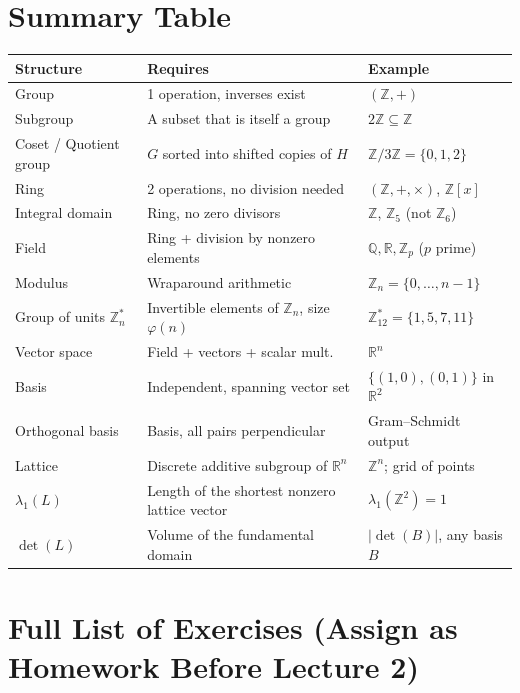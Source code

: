 \section{Summary Table}
\label{sec:L1:summary-table}

\begin{center}
\renewcommand{\arraystretch}{1.3}
\begin{tabular}{|l|l|l|}
\hline
\textbf{Structure} & \textbf{Requires} & \textbf{Example} \\
\hline
Group & 1 operation, inverses exist & $(\mathbb{Z}, +)$ \\
Subgroup & A subset that is itself a group & $2\mathbb{Z} \subseteq \mathbb{Z}$ \\
Coset / Quotient group & $G$ sorted into shifted copies of $H$ & $\mathbb{Z}/3\mathbb{Z} = \{0,1,2\}$ \\
Ring & 2 operations, no division needed & $(\mathbb{Z}, +, \times)$, $\mathbb{Z}[x]$ \\
Integral domain & Ring, no zero divisors & $\mathbb{Z}$, $\mathbb{Z}_5$ (not $\mathbb{Z}_6$) \\
Field & Ring + division by nonzero elements & $\mathbb{Q}, \mathbb{R}, \mathbb{Z}_p$ ($p$ prime) \\
Modulus & Wraparound arithmetic & $\mathbb{Z}_n = \{0,\ldots,n-1\}$ \\
Group of units $\mathbb{Z}_n^*$ & Invertible elements of $\mathbb{Z}_n$, size $\varphi(n)$ & $\mathbb{Z}_{12}^* = \{1,5,7,11\}$ \\
Vector space & Field + vectors + scalar mult. & $\mathbb{R}^n$ \\
Basis & Independent, spanning vector set & $\{(1,0),(0,1)\}$ in $\mathbb{R}^2$ \\
Orthogonal basis & Basis, all pairs perpendicular & Gram--Schmidt output \\
Lattice & Discrete additive subgroup of $\mathbb{R}^n$ & $\mathbb{Z}^n$; grid of points \\
$\lambda_1(L)$ & Length of the shortest nonzero lattice vector & $\lambda_1(\mathbb{Z}^2) = 1$ \\
$\det(L)$ & Volume of the fundamental domain & $|\det(B)|$, any basis $B$ \\
\hline
\end{tabular}
\end{center}

\section{Full List of Exercises (Assign as Homework Before Lecture 2)}
\label{sec:L1:full-list-of-exercises-assign-as-homewor}

